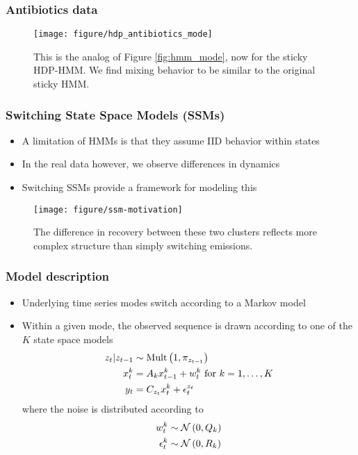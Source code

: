 \documentclass{beamer}
\begin{document}
\begin{frame}
  \frametitle{Antibiotics data}
  \begin{figure}[ht]
    \centering
    \texttt{[image: figure/hdp\_antibiotics\_mode]}
    \caption{This is the analog of Figure \ref{fig:hmm_mode}, now for the sticky
      HDP-HMM. We find mixing behavior to be similar to the original sticky
      HMM. \label{fig:hdp_mode} }
  \end{figure}
\end{frame}

\begin{frame}
  \frametitle{Switching State Space Models (SSMs)}
 \begin{itemize}
 \item A limitation of HMMs is that they assume IID behavior within states
 \item In the real data however, we observe differences in dynamics
 \item Switching SSMs provide a framework for modeling this \citep{ghahramani2000variational}
 \end{itemize} 

\begin{figure}[ht]
  \centering
  \texttt{[image: figure/ssm-motivation]}
  \caption{The difference in recovery between these two clusters reflects more
    complex structure than simply switching
    emissions. \label{fig:ssm-motivation}}
\end{figure}

\end{frame}

\begin{frame}
  \frametitle{Model description}
\begin{itemize}
\item Underlying time series modes switch according to a Markov model
\item Within a given mode, the observed sequence is drawn according to one of
  the $K$ state space models
  \begin{align*}
    z_{t} \vert z_{t - 1} &\sim \textnormal{Mult}\left(1, \pi_{z_{t - 1}}\right) \\
    x^{k}_{t} &= A_{k}x_{t - 1}^{k} + w^{k}_{t} \text{ for }k = 1, \dots, K\\
    y_{t} &= C_{z_{t}}x_{t}^{k} + \epsilon_{t}^{z_{t}}
    \end{align*}
  where the noise is distributed according to
  \begin{align*}
    w^{k}_{t} &\sim \mathcal{N}\left(0, Q_{k}\right) \\
    \epsilon^{k}_{t} &\sim \mathcal{N}\left(0, R_{k}\right)
  \end{align*}
\end{itemize}
\end{frame}
\end{document}

